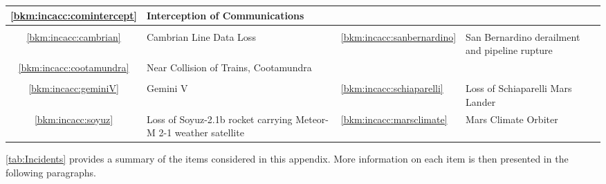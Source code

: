 \begin{longtable}{|C{}|L{}|L{}|L{}|}
    \ref{bkm:incacc:comintercept} & Interception of Communications & &\\
    \hline
    \\\hline
    \ref{bkm:incacc:cambrian} & Cambrian Line Data Loss &
    \ref{bkm:incacc:sanbernardino} &
    San Bernardino derailment and pipeline rupture\\
    \ref{bkm:incacc:cootamundra} & Near Collision of Trains, Cootamundra & &\\
    \hline
    \\\hline
    \ref{bkm:incacc:geminiV} & Gemini V &
    \ref{bkm:incacc:schiaparelli} & Loss of Schiaparelli Mars Lander\\
    \ref{bkm:incacc:soyuz} & Loss of Soyuz-2.1b rocket carrying Meteor-M 2-1 weather satellite &
    \ref{bkm:incacc:marsclimate} & Mars Climate Orbiter\\
    \hline
\end{longtable}
%
%
%
\autoref{tab:Incidents} provides a summary of the items considered in this appendix. More \gls{information} on each item is then presented in the following paragraphs.

